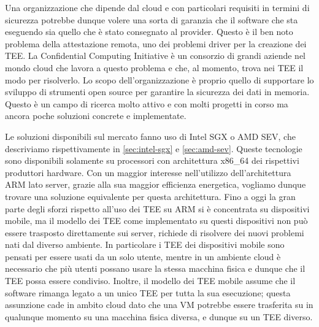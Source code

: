 \documentclass[12pt,italian]{report}
\begin{document}
Una organizzazione che dipende dal cloud e con particolari requisiti in
termini di sicurezza potrebbe dunque volere una sorta di garanzia che il
software che sta eseguendo sia quello che è stato consegnato al provider.
Questo è il ben noto problema della attestazione remota, uno dei problemi
driver per la creazione dei TEE. %
La Confidential Computing Initiative\cite{confidential-computing-initiative}
è un consorzio di grandi aziende nel mondo cloud che lavora a questo problema
e che, al momento, trova nei TEE il modo per risolverlo.
Lo scopo dell'organizzazione è proprio quello di supportare lo sviluppo
di strumenti open source per garantire la sicurezza dei dati in memoria.
Questo è un campo di ricerca molto attivo e con molti progetti in corso ma
ancora poche soluzioni concrete e implementate.

Le soluzioni disponibili sul mercato fanno uso di Intel SGX
o AMD SEV, che descriviamo rispettivamente in \ref{sec:intel-sgx} e
\ref{sec:amd-sev}. Queste tecnologie sono disponibili solamente su processori
con architettura x86\_64 dei rispettivi produttori hardware.
Con un maggior interesse nell'utilizzo dell'architettura ARM lato server, %
grazie alla sua maggior efficienza energetica, %
vogliamo dunque trovare una soluzione equivalente per questa architettura.
Fino a oggi la gran parte degli sforzi rispetto all'uso dei TEE su ARM
si è concentrata su dispositivi mobile, ma il modello dei TEE come implementato
su questi dispositivi non può essere trasposto direttamente sui server,
richiede di risolvere dei nuovi problemi nati dal diverso ambiente.
In particolare i TEE dei dispositivi mobile sono pensati per essere usati
da un solo utente, mentre in un ambiente cloud è necessario che più utenti
possano usare la stessa macchina fisica e dunque che il TEE possa essere
condiviso.
Inoltre, il modello dei TEE mobile assume che il software rimanga legato a
un unico TEE per tutta la sua esecuzione; questa assunzione cade in ambito
cloud dato che una VM potrebbe essere trasferita su in qualunque momento su
una macchina fisica diversa, e dunque su un TEE diverso.
\end{document}
